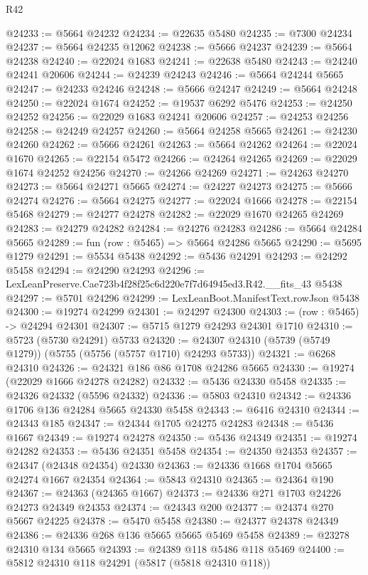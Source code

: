 \begin{lexlean}{R42}
\begin{coremodule}
@24233 := @5664 @24232
@24234 := @22635 @5480
@24235 := @7300 @24234
@24237 := @5664 @24235 @12062
@24238 := @5666 @24237
@24239 := @5664 @24238
@24240 := @22024 @1683
@24241 := @22638 @5480
@24243 := @24240 @24241 @20606
@24244 := @24239 @24243
@24246 := @5664 @24244 @5665
@24247 := @24233 @24246
@24248 := @5666 @24247
@24249 := @5664 @24248
@24250 := @22024 @1674
@24252 := @19537 @6292 @5476
@24253 := @24250 @24252
@24256 := @22029 @1683 @24241 @20606
@24257 := @24253 @24256
@24258 := @24249 @24257
@24260 := @5664 @24258 @5665
@24261 := @24230 @24260
@24262 := @5666 @24261
@24263 := @5664 @24262
@24264 := @22024 @1670
@24265 := @22154 @5472
@24266 := @24264 @24265
@24269 := @22029 @1674 @24252 @24256
@24270 := @24266 @24269
@24271 := @24263 @24270
@24273 := @5664 @24271 @5665
@24274 := @24227 @24273
@24275 := @5666 @24274
@24276 := @5664 @24275
@24277 := @22024 @1666
@24278 := @22154 @5468
@24279 := @24277 @24278
@24282 := @22029 @1670 @24265 @24269
@24283 := @24279 @24282
@24284 := @24276 @24283
@24286 := @5664 @24284 @5665
@24289 := fun (row : @5465) => @5664 @24286 @5665
@24290 := @5695 @1279
@24291 := @5534 @5438
@24292 := @5436 @24291
@24293 := @24292 @5458
@24294 := @24290 @24293
@24296 := LexLeanPreserve.Cae723b4f28f25c6d220e7f7d64945ed3.R42.__fits_43 @5438
@24297 := @5701 @24296
@24299 := LexLeanBoot.ManifestText.rowJson @5438
@24300 := @19274 @24299
@24301 := @24297 @24300
@24303 := (row : @5465) -> @24294 @24301
@24307 := @5715 @1279 @24293 @24301 @1710
@24310 := @5723 (@5730 @24291) @5733
@24320 := @24307 @24310 (@5739 (@5749 @1279)) (@5755 (@5756 (@5757 @1710) @24293 @5733))
@24321 := @6268 @24310
@24326 := @24321 @186 @86 @1708 @24286 @5665
@24330 := @19274 (@22029 @1666 @24278 @24282)
@24332 := @5436 @24330 @5458
@24335 := @24326 @24332 (@5596 @24332)
@24336 := @5803 @24310
@24342 := @24336 @1706 @136 @24284 @5665 @24330 @5458
@24343 := @6416 @24310
@24344 := @24343 @185
@24347 := @24344 @1705 @24275 @24283
@24348 := @5436 @1667
@24349 := @19274 @24278
@24350 := @5436 @24349
@24351 := @19274 @24282
@24353 := @5436 @24351 @5458
@24354 := @24350 @24353
@24357 := @24347 (@24348 @24354) @24330
@24363 := @24336 @1668 @1704 @5665 @24274 @1667 @24354
@24364 := @5843 @24310
@24365 := @24364 @190
@24367 := @24363 (@24365 @1667)
@24373 := @24336 @271 @1703 @24226 @24273 @24349 @24353
@24374 := @24343 @200
@24377 := @24374 @270 @5667 @24225
@24378 := @5470 @5458
@24380 := @24377 @24378 @24349
@24386 := @24336 @268 @136 @5665 @5665 @5469 @5458
@24389 := @23278 @24310 @134 @5665
@24393 := @24389 @118 @5486 @118 @5469
@24400 := @5812 @24310 @118 @24291 (@5817 (@5818 @24310 @118))

\end{coremodule}
\end{lexlean}
